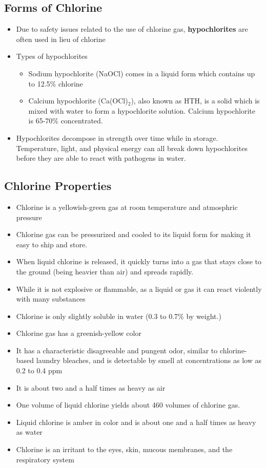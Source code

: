 \documentclass{article}
\begin{document}
\subsection{Forms of Chlorine}

\begin{itemize}
	\item Due to safety issues related to the use of chlorine gas, 			\textbf{hypochlorites} are often used in lieu of chlorine
	\item Types of hypochlorites
	\begin{itemize}
	\item Sodium hypochlorite (NaOCl) comes in a liquid form which contains up to 12.5\% chlorine
	\item Calcium hypochlorite (Ca(OCl)$_2$), also known as HTH, is a solid which is mixed with water to form a hypochlorite solution. Calcium hypochlorite is 65-70\% concentrated.
	\end{itemize}
	\item Hypochlorites decompose in strength over time while in storage. Temperature, light, and physical energy can all break down hypochlorites before they are able to react with pathogens in water. 

\end{itemize} 

\subsection{Chlorine Properties}

\begin{itemize}
\item Chlorine is a yellowish-green gas at room temperature and atmosphric pressure
\item Chlorine gas can be pressurized and cooled to its liquid form for making it easy to ship and store. 
\item When liquid chlorine is released, it quickly turns into a gas that stays close to the ground (being heavier than air) and spreads rapidly.
	\item 	While it is not explosive or flammable, as a liquid or gas it can react violently with many substances 
	\item Chlorine is only slightly soluble in water (0.3 to 0.7\% by weight.) 
	\item Chlorine gas has a greenish-yellow color 
	\item It has a characteristic disagreeable and pungent odor, similar to chlorine-based laundry bleaches, and is detectable by smell at concentrations as low as 0.2 to 0.4 ppm
	\item It is about two and a half times as heavy as air
	\item One volume of liquid chlorine yields about 460 volumes of chlorine gas. 
	\item Liquid chlorine is amber in color and is about one and a half times as heavy as water 
	\item Chlorine is an irritant to the eyes, skin, mucous membranes, and the respiratory system 
\end{itemize}
\end{document}
